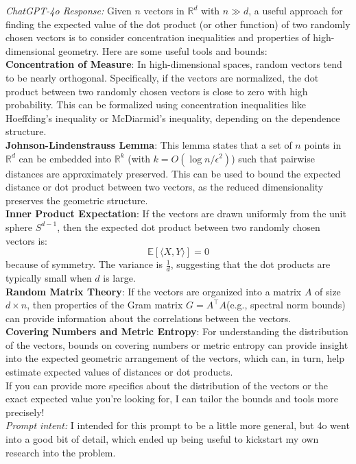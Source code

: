 \documentclass[hidelinks]{article}
\begin{document}
	\textit{ChatGPT-4o Response: }Given $n$ vectors in $\mathbb{R}^d$ with $n \gg d$, a useful approach for finding the expected value of the dot product (or other function) of two randomly chosen vectors is to consider concentration inequalities and properties of high-dimensional geometry. Here are some useful tools and bounds:\\
	
	\textbf{Concentration of Measure}: In high-dimensional spaces, random vectors tend to be nearly orthogonal. Specifically, if the vectors are normalized, the dot product between two randomly chosen vectors is close to zero with high probability. This can be formalized using concentration inequalities like Hoeffding's inequality or McDiarmid's inequality, depending on the dependence structure.\\
	
	\textbf{Johnson-Lindenstrauss Lemma}: This lemma states that a set of $n$ points in $\mathbb{R}^d$	can be embedded into $\mathbb{R}^k$ (with $k = O(\log n / \epsilon^2)$) such that pairwise distances are approximately preserved. This can be used to bound the expected distance or dot product between two vectors, as the reduced dimensionality preserves the geometric structure.\\
	
	\textbf{Inner Product Expectation}: If the vectors are drawn uniformly from the unit sphere $S^{d-1}$, then the expected dot product between two randomly chosen vectors is: \[\mathbb{E}[\langle X, Y \rangle] = 0\] because of symmetry. The variance is $\frac{1}{d}$, suggesting that the dot products are typically small when $d$ is large.\\
	
	\textbf{Random Matrix Theory}: If the vectors are organized into a matrix $A$ of size $d \times n$, then properties of the Gram matrix $G = A^{\intercal}A$(e.g., spectral norm bounds) can provide information about the correlations between the vectors.\\
	
	\textbf{Covering Numbers and Metric Entropy}: For understanding the distribution of the vectors, bounds on covering numbers or metric entropy can provide insight into the expected geometric arrangement of the vectors, which can, in turn, help estimate expected values of distances or dot products.\\
	
	If you can provide more specifics about the distribution of the vectors or the exact expected value you're looking for, I can tailor the bounds and tools more precisely!\\

	\textit{Prompt intent: }I intended for this prompt to be a little more general, but 4o went into a good bit of detail, which ended up being useful to kickstart my own research into the problem.
		
\end{document}
